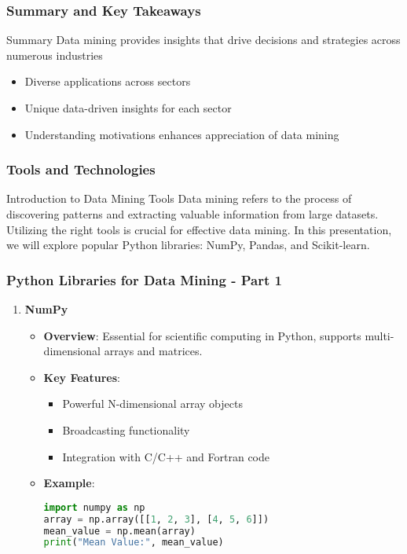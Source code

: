 \documentclass[aspectratio=169]{beamer}
\begin{document}
\begin{frame}[fragile]
    \frametitle{Summary and Key Takeaways}
    \begin{block}{Summary}
        Data mining provides insights that drive decisions and strategies across numerous industries
    \end{block}
    
    \begin{itemize}
        \item Diverse applications across sectors
        \item Unique data-driven insights for each sector
        \item Understanding motivations enhances appreciation of data mining
    \end{itemize}
\end{frame}

\begin{frame}[fragile]
    \frametitle{Tools and Technologies}
    \begin{block}{Introduction to Data Mining Tools}
        Data mining refers to the process of discovering patterns and extracting valuable information from large datasets. Utilizing the right tools is crucial for effective data mining. In this presentation, we will explore popular Python libraries: NumPy, Pandas, and Scikit-learn.
    \end{block}
\end{frame}

\begin{frame}[fragile]
    \frametitle{Python Libraries for Data Mining - Part 1}
    \begin{enumerate}
        \item \textbf{NumPy}
            \begin{itemize}
                \item \textbf{Overview}: Essential for scientific computing in Python, supports multi-dimensional arrays and matrices.
                \item \textbf{Key Features}:
                    \begin{itemize}
                        \item Powerful N-dimensional array objects
                        \item Broadcasting functionality
                        \item Integration with C/C++ and Fortran code
                    \end{itemize}
                \item \textbf{Example}:
                    \begin{lstlisting}[language=Python]
import numpy as np
array = np.array([[1, 2, 3], [4, 5, 6]])
mean_value = np.mean(array)
print("Mean Value:", mean_value)
                    \end{lstlisting}
            \end{itemize}
    \end{enumerate}
\end{frame}
\end{document}
